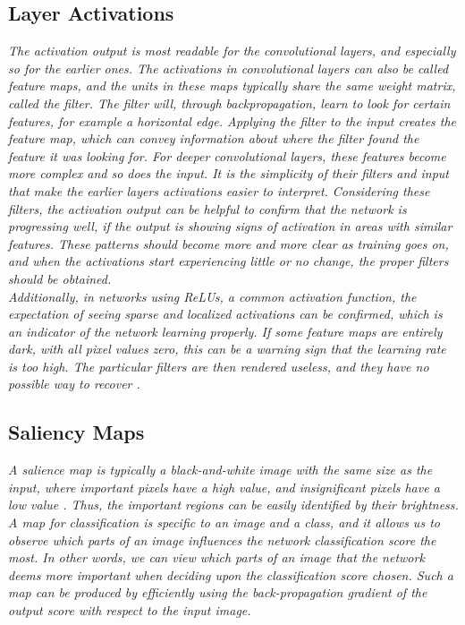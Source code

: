 \subsection{Layer Activations}

\textit{The activation output is most readable for the convolutional layers, and especially so for the earlier ones. The activations in convolutional layers can also be called feature maps, and the units in these maps typically share the same weight matrix, called the filter. The filter will, through backpropagation, learn to look for certain features, for example a horizontal edge. Applying the filter to the input creates the feature map, which can convey information about where the filter found the feature it was looking for. For deeper convolutional layers, these features become more complex and so does the input. It is the simplicity of their filters and input that make the earlier layers activations easier to interpret. Considering these filters, the activation output can be helpful to confirm that the network is progressing well, if the output is showing signs of activation in areas with similar features. These patterns should become more and more clear as training goes on, and when the activations start experiencing little or no change, the proper filters should be obtained.} \\

\noindent \textit{Additionally, in networks using ReLUs, a common activation function, the expectation of seeing sparse and localized activations can be confirmed, which is an indicator of the network learning properly. If some feature maps are entirely dark, with all pixel values zero, this can be a warning sign that the learning rate is too high. The particular filters are then rendered useless, and they have no possible way to recover \cite{cs231n_act}. }

\subsection{Saliency Maps}

\textit{A salience map is typically a black-and-white image with the same size as the input, where important pixels have a high value, and insignificant pixels have a low value \cite{salience}. Thus, the important regions can be easily identified by their brightness. A map for classification is specific to an image and a class, and it allows us to observe which parts of an image influences the network classification score the most. In other words, we can view which parts of an image that the network deems more important when deciding upon the classification score chosen. Such a map can be produced by efficiently using the back-propagation gradient of the output score with respect to the input image.} \\

